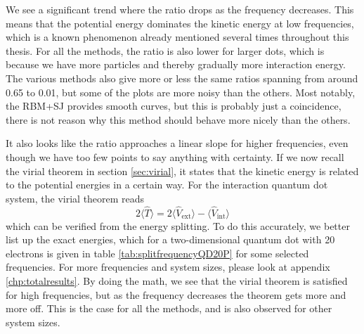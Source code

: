We see a significant trend where the ratio drops as the frequency decreases. This means that the potential energy dominates the kinetic energy at low frequencies, which is a known phenomenon already mentioned several times throughout this thesis. For all the methods, the ratio is also lower for larger dots, which is because we have more particles and thereby gradually more interaction energy. The various methods also give more or less the same ratios spanning from around 0.65 to 0.01, but some of the plots are more noisy than the others. Most notably, the RBM+SJ provides smooth curves, but this is probably just a coincidence, there is not reason why this method should behave more nicely than the others. 

It also looks like the ratio approaches a linear slope for higher frequencies, even though we have too few points to say anything with certainty. If we now recall the virial theorem in section \ref{sec:virial}, it states that the kinetic energy is related to the potential energies in a certain way. For the interaction quantum dot system, the virial theorem reads
\begin{equation}
2\langle \hat{T} \rangle=2\langle \hat{V}_{\text{ext}} \rangle-\langle \hat{V}_{\text{int}} \rangle
\end{equation}
which can be verified from the energy splitting. To do this accurately, we better list up the exact energies, which for a two-dimensional quantum dot with 20 electrons is given in table \eqref{tab:splitfrequencyQD20P} for some selected frequencies. For more frequencies and system sizes, please look at appendix \ref{chp:totalresults}. By doing the math, we see that the virial theorem is satisfied for high frequencies, but as the frequency decreases the theorem gets more and more off. This is the case for all the methods, and is also observed for other system sizes. 

